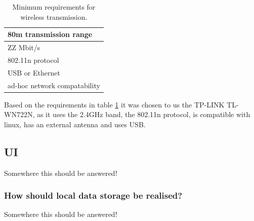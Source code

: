 \begin{table}[]
\centering
\caption{Minimum requirements for wireless transmission.}
\label{tab:req_wifi}
\begin{tabular}{|l|}
\hline
80m transmission range       \\ \hline
ZZ Mbit/s                    \\ \hline
802.11n protocol             \\ \hline
USB or Ethernet              \\ \hline
ad-hoc network compatability \\ \hline
\end{tabular}
\end{table}
Based on the requirements in table \ref{tab:req_wifi} it was chosen to us the TP-LINK TL-WN722N, as it uses the 2.4GHz band, the 802.11n protocol, is compatible with linux, has an external antenna and uses USB. 






















\subsection{UI}
Somewhere this should be answered!












\subsubsection*{How should local data storage be realised?}
Somewhere this should be answered!



	


